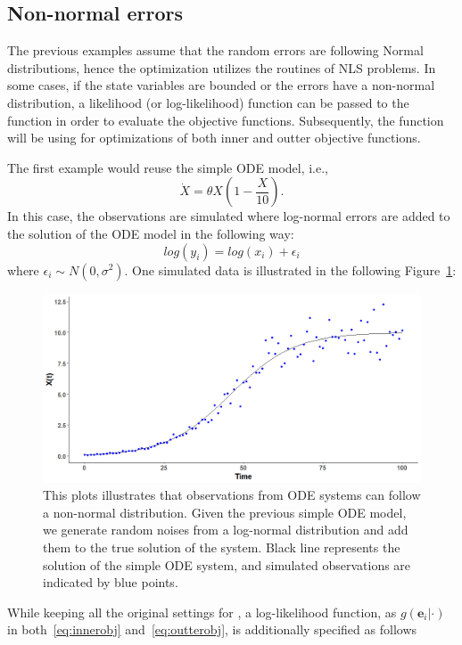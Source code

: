 \subsection{Non-normal errors}
The previous examples assume that the random errors are following Normal distributions, hence the optimization utilizes the routines of NLS problems. In some cases, if the state variables are bounded or the errors have a non-normal distribution, a likelihood (or log-likelihood) function can be passed to the function  in order to evaluate the objective functions. Subsequently, the function  will be using  for optimizations of both inner and outter objective functions. \par 
The first example would reuse the simple ODE model, i.e., 
\begin{equation*}
\dot{X} = \theta X (1-\frac{X}{10}).
\end{equation*}
In this case, the observations are simulated where log-normal errors are added to the solution of the ODE model in the following way:
\begin{equation*}
log(y_{i}) = log(x_{i}) + \epsilon_{i}
\end{equation*}
where $\epsilon_{i} \sim N(0,\sigma^{2})$. One simulated data is illustrated in the following Figure~\ref{fig:lognormal}:
\begin{figure}[H]
\centering 
\includegraphics[width=\textwidth]{log_observation.png}
\caption{\label{fig:lognormal} This plots illustrates that observations from ODE systems can follow a non-normal distribution. Given the previous simple ODE model, we generate random noises from a log-normal distribution and add them to the true solution of the system. Black line represents the solution of the simple ODE system, and simulated observations are indicated by blue points.}
\end{figure}
While keeping all the original settings for , a log-likelihood function, as $g(\bm{e}_{i}|\cdot)$ in both~\ref{eq:innerobj} and~\ref{eq:outterobj}, is additionally specified as follows
